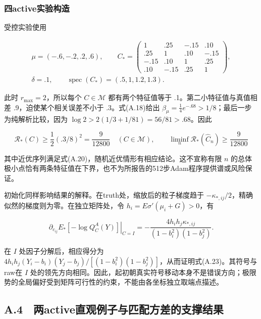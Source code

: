 \documentclass[11pt,a4paper]{article}
\begin{document}
\subsubsection*{四active实验构造}\label{ux56dbactiveux5b9eux9a8cux6784ux9020}

受控实验使用

\[
\begin{gathered}
\mu=(-.6,-.2,.2,.6),\qquad
C_*=\begin{pmatrix}
1&.25&-.15&.10\\.25&1&.10&-.15\\
-.15&.10&1&.25\\.10&-.15&.25&1
\end{pmatrix},\\
\delta=.1,\qquad
\operatorname{spec}(C_*)=(.5,1,1.2,1.3).
\end{gathered}
\tag{A.21}
\]

此时 \(r_{\max}=2\)，所以每个 \(C\in\mathcal M\) 都有两个特征值等于
.1。第二小特征值与真值相差 .9，迫使某个相关误差不小于 .3。式(A.18)给出
\(\beta_\mu=\tfrac14e^{-.68}>1/8\)；最后一步为纯解析比较，因为
\(\log2>2(1/3+1/81)=56/81>.68\)。因此

\[
\mathcal R_*(C)\ge\frac12(.3/8)^2=\frac9{12800}
\quad(C\in\mathcal M),
\qquad
\liminf_n\mathcal R_*(\widehat C_n)\ge\frac9{12800}
\tag{A.22}
\]

其中近优序列满足式(A.20)，随机近优情形有相应结论。这不宣称有限 \(n\)
的总体极小点恰有两条特征值在下界，也不为所报告的512步Adam程序提供谱或风险保证。

初始化同样影响结果的解释。在truth处，缩放后的粒子梯度趋于
\(-\kappa_{*,ij}/2\)，精确似然的梯度则为零。在独立矩阵处，令
\(h_i=E\sigma'(\mu_i+G)>0\)，有

\[
\left.\partial_{c_{ij}}E_*[-\log Q_C^A(Y)]\right|_{C=I}
=-\frac{4h_ih_j\kappa_{*,ij}}{(1-b_i^2)(1-b_j^2)} .
\tag{A.23}
\]

在 \(I\) 处因子分解后，相应得分为
\(4h_ih_j(Y_i-b_i)(Y_j-b_j)/[(1-b_i^2)(1-b_j^2)]\)，从而证明式(A.23)。其符号与raw在
\(I\)
处的领先方向相同。因此，起初朝真实符号移动本身不是错误方向；极限势的全局偏好受到矩阵可行性的约束，不能由各坐标独立取端点描述。

\subsection*{A.4　两active直观例子与匹配方差的支撑结果}\label{a.4-ux4e24activeux76f4ux89c2ux4f8bux5b50ux4e0eux5339ux914dux65b9ux5deeux7684ux652fux6491ux7ed3ux679c}
\end{document}
